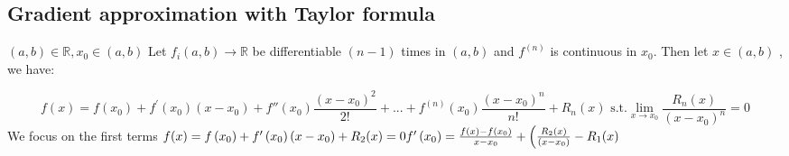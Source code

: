 \subsection{Gradient approximation with Taylor formula}

$(a,b) \in \mathbb{R}, x_0 \in (a,b)$
\noindent
Let $f_i(a,b) \rightarrow \mathbb{R}$ be differentiable $(n-1)$ times in
$(a,b)$ and $f^{(n)}$ is continuous in $x_0$. Then let $x \in (a,b)$ ,
we have:

$$
f(x)=f\left(x_0\right)+f^{\prime}\left(x_0\right)\left(x-x_0\right)+f''(x_0)\frac{(x-x_0)^2}{2!}+ ...+ f^{(n)}(x_0)\frac{(x-x_0)^n}{n!} + R_n(x) \text{ s.t.} \lim_{x \rightarrow x_0} \frac{R_n(x)}{(x-x_0)^n} =0 
$$
\noindent
We focus on the first terms
$f(x)=f\left(x_0\right)+f^{\prime}\left(x_0\right)\left(x-x_0\right)+R_2(x)=0 \\ f^{\prime}\left(x_0\right)=\frac{f(x)-f\left(x_0\right)}{x-x_0}+\left(\frac{R_2(x)}{\left(x-x_0\right)}-R_1(x)\right.$

